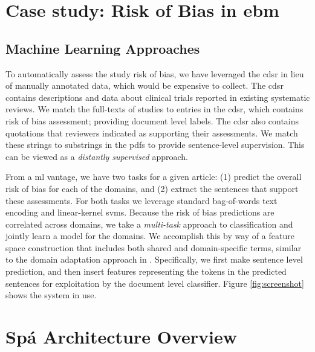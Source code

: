 \documentclass{llncs}
\begin{document}
\section{Case study: Risk of Bias in \acl{ebm}}
\label{section:EBM-ML}

\subsection{Machine Learning Approaches}
To automatically assess the study risk of bias, we have leveraged the \ac{cdsr} in lieu of manually annotated data, which would be expensive to collect.
The \ac{cdsr} contains descriptions and data about clinical trials reported in existing systematic reviews.
We match the full-texts of studies to entries in the \ac{cdsr}, which contains risk of bias assessment; providing document level labels.
The \ac{cdsr} also contains quotations that reviewers indicated as supporting their assessments.
We match these strings to substrings in the \acp{pdf} to provide sentence-level supervision.
This can be viewed as a \emph{distantly supervised} \cite{Mintz09,Nguyen11} approach.

From a \ac{ml} vantage, we have two tasks for a given article: (1) predict the overall risk of bias for each of the domains, and (2) extract the sentences that support these assessments.
For both tasks we leverage standard bag-of-words text encoding and linear-kernel \aclp{svm}.
Because the risk of bias predictions are correlated across domains, we take a \emph{multi-task} \cite{Evgeniou2004} approach to classification and jointly learn a model for the domains.
We accomplish this by way of a feature space construction that includes both shared and domain-specific terms, similar to the domain adaptation approach in \cite{Daume2007}.
Specifically, we first make sentence level prediction, and then insert features representing the tokens in the predicted sentences for exploitation by the document level classifier.
Figure \ref{fig:screenshot} shows the system in use.

\section{Spá Architecture Overview}

\end{document}
